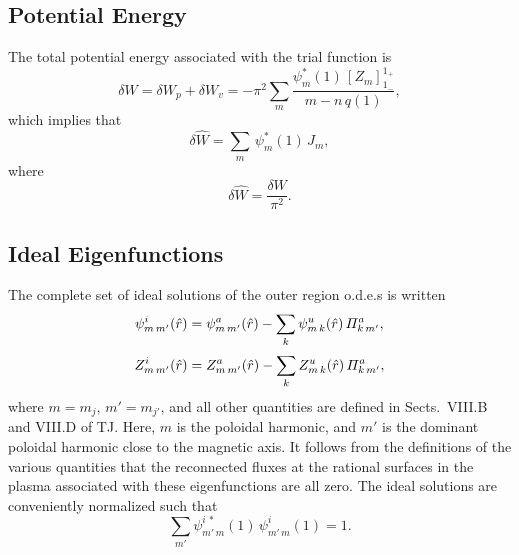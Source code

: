 \documentclass[12pt,prb,aps,notitlepage]{revtex4-1}
\begin{document}
\subsection{Potential Energy}
The total potential energy associated with the trial function is
\begin{equation}
\delta W = \delta W_p + \delta W_v = -\pi^2\sum_m \frac{\psi_m^\ast(1)\,[Z_m]_{1_{-}}^{1_{+}}}{m-n\,q(1)},
\end{equation}
which implies that
\begin{equation}
\delta \hat{W} =\sum_m\,\psi_m^\ast(1)\,J_m,
\end{equation}
where
\begin{equation}
\delta \hat{W} = \frac{\delta W}{\pi^2}.
\end{equation}

\subsection{Ideal Eigenfunctions}
The complete set of ideal solutions of the outer region o.d.e.s is written
\begin{align}
\psi_{m\,m'}^i(\hat{r})&= \psi_{m\,m'}^a(\hat{r})-\sum_{k}\psi_{m\,k}^u(\hat{r})\,{\mit\Pi}_{k\,m'}^a,\\[0.5ex]
Z_{m\,m'}^i(\hat{r})&= Z_{m\,m'}^a(\hat{r})-\sum_{k}Z_{m\,k}^u(\hat{r})\,{\mit\Pi}_{k\,m'}^a,
\end{align}
where $m=m_j$, $m'=m_{j'}$, and all other quantities are defined in Sects.~VIII.B and VIII.D of TJ. 
Here, $m$ is the poloidal harmonic, and $m'$ is the dominant poloidal harmonic close to the magnetic axis. It follows
from the definitions of the various quantities that the reconnected fluxes at the rational surfaces in the plasma
associated with these eigenfunctions are all zero. The ideal solutions are conveniently normalized such
that
\begin{equation}
\sum_{m'}\psi_{m'\,m}^{i\,\ast}(1)\,\psi_{m'\,m}^i(1) = 1.
\end{equation}
\end{document}
